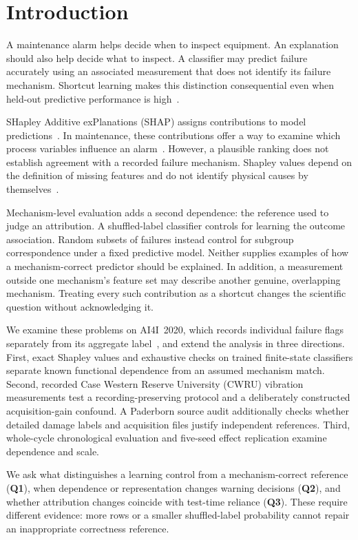\documentclass[conference]{IEEEtran}
\begin{document}
\section{Introduction}
\label{sec:intro}
A maintenance alarm helps decide when to inspect equipment. An explanation should also help decide what to inspect. A classifier may predict failure accurately using an associated measurement that does not identify its failure mechanism. Shortcut learning makes this distinction consequential even when held-out predictive performance is high~\cite{geirhos2020shortcut,lapuschkin2019unmasking}.

SHapley Additive exPlanations (SHAP) assigns contributions to model predictions~\cite{lundberg2017shap}. In maintenance, these contributions offer a way to examine which process variables influence an alarm~\cite{matzka2020explainable,vollert2021interpretable}. However, a plausible ranking does not establish agreement with a recorded failure mechanism. Shapley values depend on the definition of missing features and do not identify physical causes by themselves~\cite{janzing2020feature,kumar2020problems}.

Mechanism-level evaluation adds a second dependence: the reference used to judge an attribution. A shuffled-label classifier controls for learning the outcome association. Random subsets of failures instead control for subgroup correspondence under a fixed predictive model. Neither supplies examples of how a mechanism-correct predictor should be explained. In addition, a measurement outside one mechanism's feature set may describe another genuine, overlapping mechanism. Treating every such contribution as a shortcut changes the scientific question without acknowledging it.

We examine these problems on AI4I~2020, which records individual failure flags separately from its aggregate label~\cite{uci2020ai4i}, and extend the analysis in three directions. First, exact Shapley values and exhaustive checks on trained finite-state classifiers separate known functional dependence from an assumed mechanism match. Second, recorded Case Western Reserve University (CWRU) vibration measurements test a recording-preserving protocol and a deliberately constructed acquisition-gain confound. A Paderborn source audit additionally checks whether detailed damage labels and acquisition files justify independent references. Third, whole-cycle chronological evaluation and five-seed effect replication examine dependence and scale.

We ask what distinguishes a learning control from a mechanism-correct reference (\textbf{Q1}), when dependence or representation changes warning decisions (\textbf{Q2}), and whether attribution changes coincide with test-time reliance (\textbf{Q3}). These require different evidence: more rows or a smaller shuffled-label probability cannot repair an inappropriate correctness reference.
\end{document}
